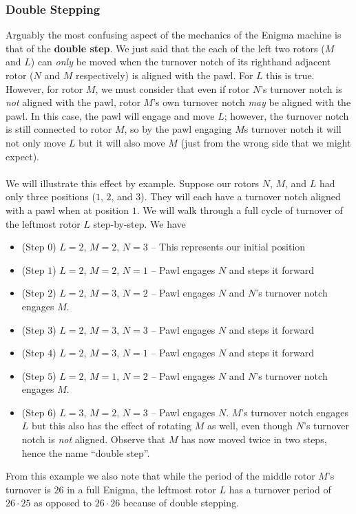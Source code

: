 \subsubsection{Double Stepping}\label{double_step}
Arguably the most confusing aspect of the mechanics of the Enigma machine is that of the {\bf{double step}}. We just said that the each of the left two rotors ($M$ and $L$) can \emph{only} be moved when the turnover notch of its righthand adjacent rotor ($N$ and $M$ respectively) is aligned with the pawl. For $L$ this is true. However, for rotor $M$, we must consider that even if rotor $N$'s turnover notch is \emph{not} aligned with the pawl, rotor $M$'s own turnover notch \emph{may} be aligned with the pawl. In this case, the pawl will engage and move $L$; however, the turnover notch is still connected to rotor $M$, so by the pawl engaging $M$s turnover notch it will not only move $L$ but it will also move $M$ (just from the wrong side that we might expect).
\\\\We will illustrate this effect by example. Suppose our rotors $N$, $M$, and $L$ had only three positions ($1$, $2$, and $3$). They will each have a turnover notch aligned with a pawl when at position $1$. We will walk through a full cycle of turnover of the leftmost rotor $L$ step-by-step. We have
\begin{itemize}
	\item (Step $0$) $L = 2$, $M = 2$, $N = 3$ -- This represents our initial position
	\item (Step $1$) $L = 2$, $M = 2$, $N = 1$ -- Pawl engages $N$ and steps it forward
	\item (Step $2$) $L = 2$, $M = 3$, $N = 2$ -- Pawl engages $N$ and $N$'s turnover notch engages $M$.
	\item (Step $3$) $L = 2$, $M = 3$, $N = 3$ -- Pawl engages $N$ and steps it forward
	\item (Step $4$) $L = 2$, $M = 3$, $N = 1$ -- Pawl engages $N$ and steps it forward
	\item (Step $5$) $L = 2$, $M = 1$, $N = 2$ -- Pawl engages $N$ and $N$'s turnover notch engages $M$.
	\item (Step $6$) $L = 3$, $M = 2$, $N = 3$ -- Pawl engages $N$. $M$'s turnover notch engages $L$ but this also has the effect of rotating $M$ as well, even though $N$'s turnover notch is \emph{not} aligned. Observe that $M$ has now moved twice in two steps, hence the name ``double step''.
\end{itemize}
From this example we also note that while the period of the middle rotor $M$'s turnover is $26$ in a full Enigma, the leftmost rotor $L$ has a turnover period of $26\cdot25$ as opposed to $26\cdot26$ because of double stepping.
